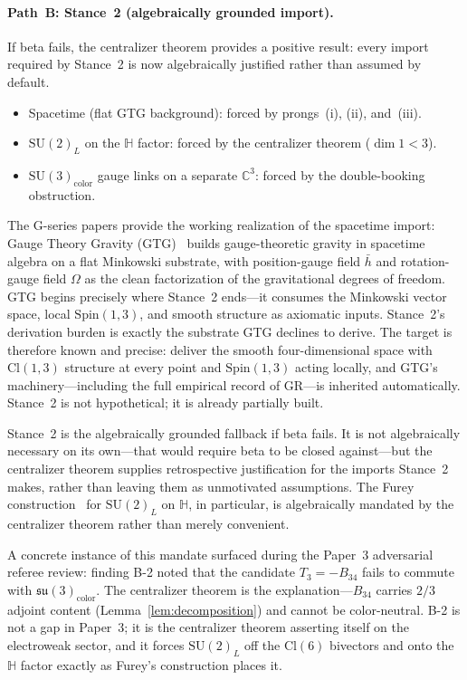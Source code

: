 \documentclass[aip,jmp,amsmath,amssymb,reprint,author-year]{revtex4-2}
\begin{document}
\paragraph{Path~B: Stance~2 (algebraically grounded import).}
If beta fails, the centralizer theorem provides a positive result: every
import required by Stance~2 is now algebraically justified rather than
assumed by default.

\begin{itemize}
\item Spacetime (flat GTG background): forced by prongs~(i), (ii),
  and~(iii).
\item $\mathrm{SU}(2)_L$ on the $\mathbb{H}$ factor: forced by the
  centralizer theorem ($\dim 1 < 3$).
\item $\mathrm{SU}(3)_{\mathrm{color}}$ gauge links on a separate
  $\mathbb{C}^3$: forced by the double-booking obstruction.
\end{itemize}

The G-series papers provide the working realization of the spacetime
import: Gauge Theory Gravity
(GTG)~\citep{LasenbyDoranGull1998} builds gauge-theoretic gravity in
spacetime algebra on a flat Minkowski substrate, with position-gauge field
$\bar{h}$ and rotation-gauge field $\Omega$ as the clean factorization of
the gravitational degrees of freedom.  GTG begins precisely where
Stance~2 ends---it consumes the Minkowski vector space, local
$\mathrm{Spin}(1,3)$, and smooth structure as axiomatic inputs.
Stance~2's derivation burden is exactly the substrate GTG declines to
derive.  The target is therefore known and precise: deliver the smooth
four-dimensional space with $\mathrm{Cl}(1,3)$ structure at every point
and $\mathrm{Spin}(1,3)$ acting locally, and GTG's machinery---including
the full empirical record of GR---is inherited automatically.  Stance~2
is not hypothetical; it is already partially built.

Stance~2 is the algebraically grounded fallback if beta fails.  It is not
algebraically necessary on its own---that would require beta to be closed
against---but the centralizer theorem supplies retrospective
justification for the imports Stance~2 makes, rather than leaving them as
unmotivated assumptions.  The Furey
construction~\citep{Furey2016} for $\mathrm{SU}(2)_L$ on $\mathbb{H}$,
in particular, is algebraically mandated by the centralizer theorem
rather than merely convenient.

A concrete instance of this mandate surfaced during the Paper~3
adversarial referee review: finding B-2 noted that the candidate
$T_3 = -B_{34}$ fails to commute with $\mathfrak{su}(3)_{\mathrm{color}}$.
The centralizer theorem is the explanation---$B_{34}$ carries $2/3$
adjoint content (Lemma~\ref{lem:decomposition}) and cannot be
color-neutral.  B-2 is not a gap in Paper~3; it is the centralizer
theorem asserting itself on the electroweak sector, and it forces
$\mathrm{SU}(2)_L$ off the $\mathrm{Cl}(6)$ bivectors and onto the
$\mathbb{H}$ factor exactly as Furey's construction places it.
\end{document}
